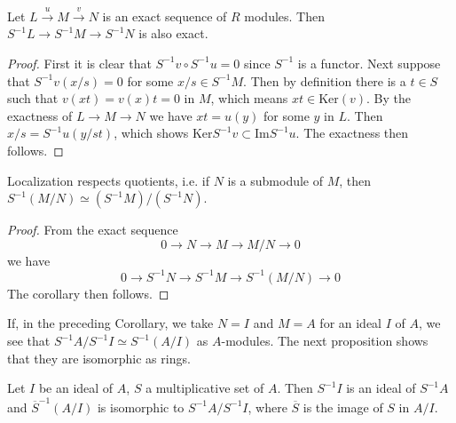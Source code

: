 \begin{proposition}
\label{proposition-localization-exact}
Let $L\xrightarrow{u} M\xrightarrow{v} N$ is an exact sequence
of $R$ modules. Then
$S^{-1}L\rightarrow S^{-1}M\rightarrow S^{-1}N$ is also exact.
\end{proposition}

\begin{proof}
First it is clear that $S^{-1}v\circ S^{-1}u = 0$ since $S^{-1}$ is a
functor. Next suppose that $S^{-1}v(x/s) = 0$ for some $x/s\in
S^{-1}M$. Then by definition there is a $t\in S$ such that
$v(xt) = v(x)t = 0$ in $M$, which means $xt\in\text{Ker}(v)$.
By the exactness of $L\rightarrow M\rightarrow
N$ we have $xt = u(y)$ for some $y$ in $L$. Then $x/s = S^{-1}u(y/st)$,
which shows $\text{Ker} S^{-1}v\subset\text{Im} S^{-1}u$. The exactness then
follows.
\end{proof}

\begin{lemma}
\label{lemma-localize-quotient-modules}
Localization respects quotients, i.e. if $N$ is a submodule of
$M$, then $S^{-1}(M/N)\simeq (S^{-1}M)/(S^{-1}N)$.
\end{lemma}

\begin{proof}
From the exact sequence
$$
0 \longrightarrow N \longrightarrow M \longrightarrow M/N \longrightarrow 0
$$
we have
$$
0 \longrightarrow S^{-1}N \longrightarrow S^{-1}M
\longrightarrow S^{-1}(M/N) \longrightarrow 0
$$
The corollary then follows.
\end{proof}

\noindent
If, in the preceding Corollary, we take $N = I$ and $M = A$ for an ideal $I$ of
$A$, we see that $S^{-1}A/S^{-1}I \simeq S^{-1}(A/I)$ as $A$-modules. The next
proposition shows that they are isomorphic as rings.

\begin{proposition}
\label{proposition-localize-quotient}
Let $I$ be an ideal of $A$, $S$ a multiplicative set of $A$. Then
$S^{-1}I$ is an ideal of $S^{-1}A$ and $\overline{S}^{-1}(A/I)$ is
isomorphic to $S^{-1}A/S^{-1}I$, where $\overline{S}$ is
the image of $S$ in $A/I$.
\end{proposition}

